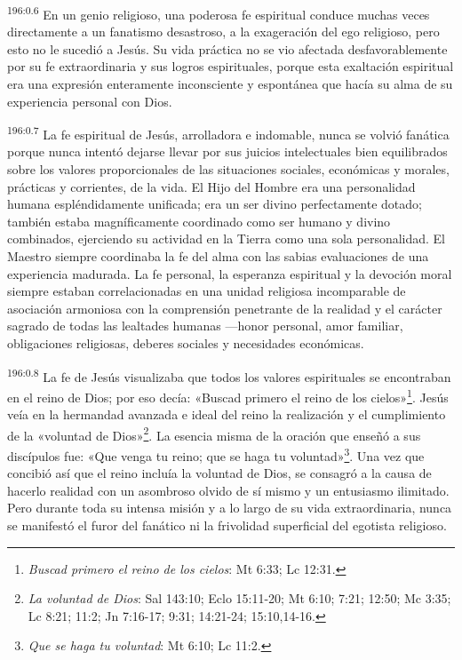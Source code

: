 \par
\textsuperscript{196:0.6} En un genio religioso, una poderosa fe espiritual conduce muchas veces directamente a un fanatismo desastroso, a la exageración del ego religioso, pero esto no le sucedió a Jesús. Su vida práctica no se vio afectada desfavorablemente por su fe extraordinaria y sus logros espirituales, porque esta exaltación espiritual era una expresión enteramente inconsciente y espontánea que hacía su alma de su experiencia personal con Dios.

\par
\textsuperscript{196:0.7} La fe espiritual de Jesús, arrolladora e indomable, nunca se volvió fanática porque nunca intentó dejarse llevar por sus juicios intelectuales bien equilibrados sobre los valores proporcionales de las situaciones sociales, económicas y morales, prácticas y corrientes, de la vida. El Hijo del Hombre era una personalidad humana espléndidamente unificada; era un ser divino perfectamente dotado; también estaba magníficamente coordinado como ser humano y divino combinados, ejerciendo su actividad en la Tierra como una sola personalidad. El Maestro siempre coordinaba la fe del alma con las sabias evaluaciones de una experiencia madurada. La fe personal, la esperanza espiritual y la devoción moral siempre estaban correlacionadas en una unidad religiosa incomparable de asociación armoniosa con la comprensión penetrante de la realidad y el carácter sagrado de todas las lealtades humanas ---honor personal, amor familiar, obligaciones religiosas, deberes sociales y necesidades económicas.

\par
\textsuperscript{196:0.8} La fe de Jesús visualizaba que todos los valores espirituales se encontraban en el reino de Dios; por eso decía: «Buscad primero el reino de los cielos»\footnote{\textit{Buscad primero el reino de los cielos}: Mt 6:33; Lc 12:31.}. Jesús veía en la hermandad avanzada e ideal del reino la realización y el cumplimiento de la «voluntad de Dios»\footnote{\textit{La voluntad de Dios}: Sal 143:10; Eclo 15:11-20; Mt 6:10; 7:21; 12:50; Mc 3:35; Lc 8:21; 11:2; Jn 7:16-17; 9:31; 14:21-24; 15:10,14-16.}. La esencia misma de la oración que enseñó a sus discípulos fue: «Que venga tu reino; que se haga tu voluntad»\footnote{\textit{Que se haga tu voluntad}: Mt 6:10; Lc 11:2.}. Una vez que concibió así que el reino incluía la voluntad de Dios, se consagró a la causa de hacerlo realidad con un asombroso olvido de sí mismo y un entusiasmo ilimitado. Pero durante toda su intensa misión y a lo largo de su vida extraordinaria, nunca se manifestó el furor del fanático ni la frivolidad superficial del egotista religioso.

